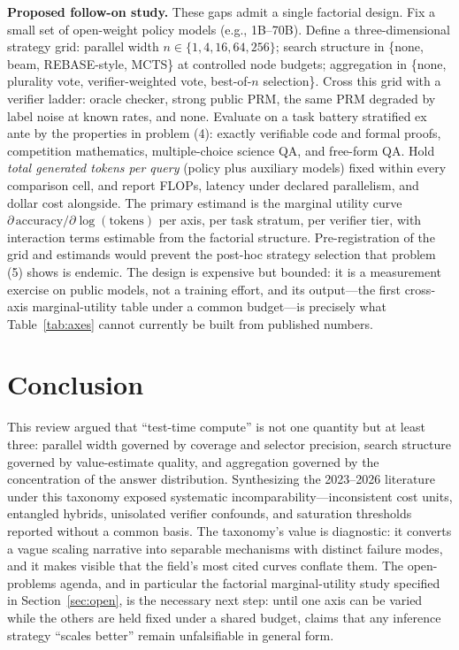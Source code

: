 \documentclass[10pt]{article}
\begin{document}
\textbf{Proposed follow-on study.} These gaps admit a single factorial design. Fix a small set of open-weight policy models (e.g., 1B--70B). Define a three-dimensional strategy grid: parallel width $n \in \{1,4,16,64,256\}$; search structure in \{none, beam, REBASE-style, MCTS\} at controlled node budgets; aggregation in \{none, plurality vote, verifier-weighted vote, best-of-$n$ selection\}. Cross this grid with a verifier ladder: oracle checker, strong public PRM, the same PRM degraded by label noise at known rates, and none. Evaluate on a task battery stratified ex ante by the properties in problem (4): exactly verifiable code and formal proofs, competition mathematics, multiple-choice science QA, and free-form QA. Hold \emph{total generated tokens per query} (policy plus auxiliary models) fixed within every comparison cell, and report FLOPs, latency under declared parallelism, and dollar cost alongside. The primary estimand is the marginal utility curve $\partial\,\text{accuracy} / \partial \log(\text{tokens})$ per axis, per task stratum, per verifier tier, with interaction terms estimable from the factorial structure. Pre-registration of the grid and estimands would prevent the post-hoc strategy selection that problem (5) shows is endemic. The design is expensive but bounded: it is a measurement exercise on public models, not a training effort, and its output---the first cross-axis marginal-utility table under a common budget---is precisely what Table~\ref{tab:axes} cannot currently be built from published numbers.

\section{Conclusion}
\label{sec:conclusion}

This review argued that ``test-time compute'' is not one quantity but at least three: parallel width governed by coverage and selector precision, search structure governed by value-estimate quality, and aggregation governed by the concentration of the answer distribution. Synthesizing the 2023--2026 literature under this taxonomy exposed systematic incomparability---inconsistent cost units, entangled hybrids, unisolated verifier confounds, and saturation thresholds reported without a common basis. The taxonomy's value is diagnostic: it converts a vague scaling narrative into separable mechanisms with distinct failure modes, and it makes visible that the field's most cited curves conflate them. The open-problems agenda, and in particular the factorial marginal-utility study specified in Section~\ref{sec:open}, is the necessary next step: until one axis can be varied while the others are held fixed under a shared budget, claims that any inference strategy ``scales better'' remain unfalsifiable in general form.
\end{document}
